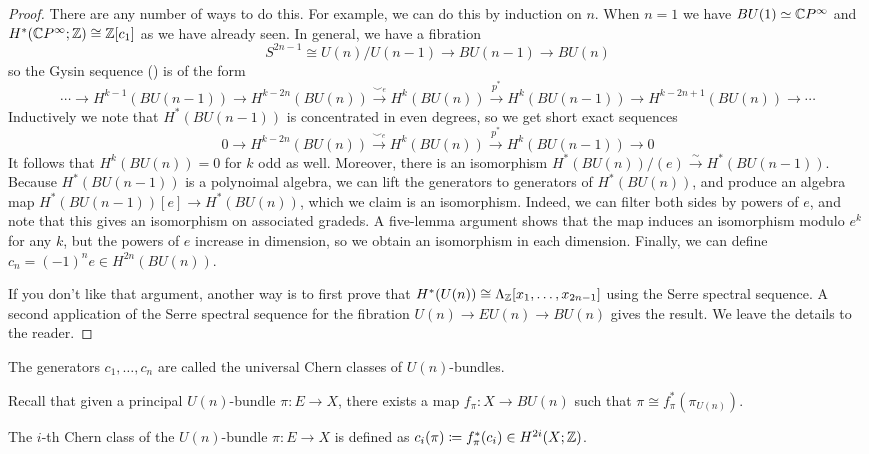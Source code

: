 \documentclass[ma3408.tex]{subfiles}
\begin{document}
\begin{proof}
There are any number of ways to do this. For example, we can do this by induction on $n$. When $n = 1$ we have $BU(1) \simeq \mathbb{C} P^{\infty}$ and $H^*(\mathbb{C} P^{\infty};\mathbb{Z}) \cong \mathbb{Z}[c_1]$ as we have already seen. In general, we have a fibration
\[
S^{2n-1} \cong U(n)/U(n-1) \to BU(n-1)\to BU(n)
\]
so the Gysin sequence () is of the form
\[
\cdots \to H^{k-1}(BU(n-1)) \to H^{k-2n}(BU(n)) \xrightarrow{\smile_e} H^{k}(BU(n)) \xrightarrow{p^*} H^{k}(BU(n-1)) \to H^{k-2n+1}(BU(n)) \to \cdots
\]
Inductively we note that $H^{*}(BU(n-1))$ is concentrated in even degrees, so we get short exact sequences
\[
0 \to H^{k-2n}(BU(n)) \xrightarrow{\smile_e} H^{k}(BU(n)) \xrightarrow{p^*} H^{k}(BU(n-1)) \to 0
\]
It follows that $H^k(BU(n)) = 0$ for $k$ odd as well. Moreover, there is an isomorphism $H^*(BU(n))/(e) \xrightarrow{\sim} H^*(BU(n-1))$. Because $H^*(BU(n-1))$ is a polynoimal algebra, we can lift the generators to generators of $H^*(BU(n))$, and produce an algebra map $H^*(BU(n-1))[e] \to H^*(BU(n))$, which we claim is an isomorphism. Indeed, we can filter both sides by powers of $e$, and note that this gives an isomorphism on associated gradeds. A five-lemma argument shows that the map induces an isomorphism modulo $e^k$ for any $k$, but the powers of $e$ increase in dimension, so we obtain an isomorphism in each dimension. Finally, we can define $c_n = (-1)^ne \in H^{2n}(BU(n))$. 

If you don't like that argument, another way is to first prove that $H^*(U(n)) \cong \Lambda_{\mathbb{Z}}[x_1,\ldots,x_{2n-1}]$ using the Serre spectral sequence. A second application of the Serre spectral sequence for the fibration $U(n) \to EU(n) \to BU(n)$ gives the result. We leave the details to the reader. 
\end{proof}
\begin{Def}
The generators $c_1,\ldots,c_n$ are called the universal Chern classes of $U(n)$-bundles. 
\end{Def}
\begin{Rem}
Recall that given a principal $U(n)$-bundle $\pi \colon E \to X$, there exists a map $f_{\pi} \colon X \to BU(n)$ such that $\pi \cong f^*_{\pi}(\pi_{U(n)})$. 
\end{Rem}
\begin{Def}
The $i$-th Chern class of the $U(n)$-bundle $\pi \colon E \to X$ is defined as $c_i(\pi) \coloneqq f_{\pi}^*(c_i) \in H^{2i}(X;\mathbb{Z})$. 
\end{Def}
\end{document}
